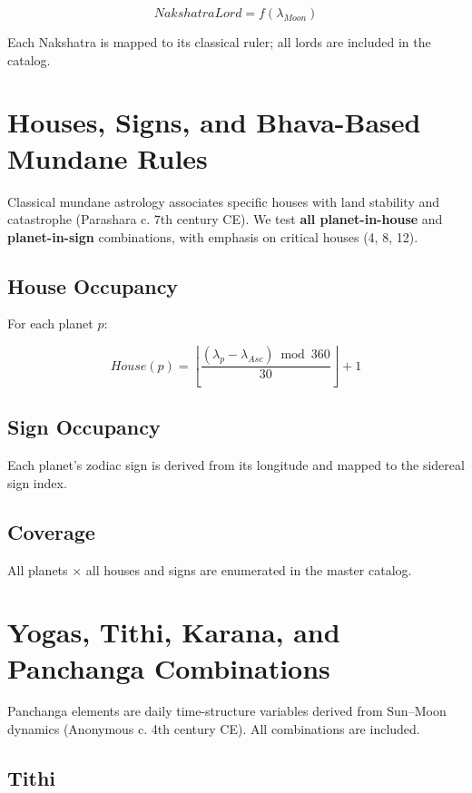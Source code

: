 \documentclass[
  11pt,
  a4paper,
  oneside,
  openany]{report}
\begin{document}
\[
NakshatraLord = f(\lambda_{Moon})
\]

Each Nakshatra is mapped to its classical ruler; all lords are included
in the catalog.

\chapter{Houses, Signs, and Bhava-Based Mundane
Rules}\label{houses-signs-and-bhava-based-mundane-rules}

Classical mundane astrology associates specific houses with land
stability and catastrophe (Parashara c. 7th century CE). We test
\textbf{all planet-in-house} and \textbf{planet-in-sign} combinations,
with emphasis on critical houses (4, 8, 12).

\section{House Occupancy}\label{house-occupancy}

For each planet \(p\):

\[
House(p) = \left\lfloor \frac{(\lambda_p - \lambda_{Asc}) \bmod 360}{30} \right\rfloor + 1
\]

\section{Sign Occupancy}\label{sign-occupancy}

Each planet's zodiac sign is derived from its longitude and mapped to
the sidereal sign index.

\section{Coverage}\label{coverage}

All planets × all houses and signs are enumerated in the master catalog.

\chapter{Yogas, Tithi, Karana, and Panchanga
Combinations}\label{yogas-tithi-karana-and-panchanga-combinations}

Panchanga elements are daily time-structure variables derived from
Sun--Moon dynamics (Anonymous c. 4th century CE). All combinations are
included.

\section{Tithi}\label{tithi}
\end{document}
